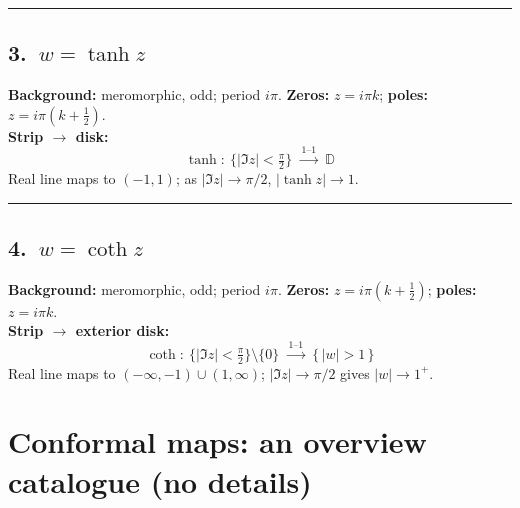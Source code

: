 \documentclass[11pt]{article}
\begin{document}
\bigskip\hrule\bigskip

\subsection*{3.\ $w=\tanh z$}
\textbf{Background:} meromorphic, odd; period $i\pi$. \quad
\textbf{Zeros:} $z=i\pi k$; \textbf{poles:} $z=i\pi(k+\tfrac12)$.\\
\textbf{Strip $\to$ disk:}
\[
\boxed{\,\tanh:\ \{|\Im z|<\tfrac{\pi}{2}\}\ \xrightarrow{\ 1\text{--}1\ }\ \mathbb D\,}
\]
Real line maps to $(-1,1)$; as $|\Im z|\to\pi/2$, $|\tanh z|\to1$.

\bigskip\hrule\bigskip

\subsection*{4.\ $w=\coth z$}
\textbf{Background:} meromorphic, odd; period $i\pi$. \quad
\textbf{Zeros:} $z=i\pi(k+\tfrac12)$; \textbf{poles:} $z=i\pi k$.\\
\textbf{Strip $\to$ exterior disk:}
\[
\boxed{\,\coth:\ \{|\Im z|<\tfrac{\pi}{2}\}\setminus\{0\}\ \xrightarrow{\ 1\text{--}1\ }\ \{\,|w|>1\,\}\,}
\]
Real line maps to $(-\infty,-1)\cup(1,\infty)$; $|\Im z|\to\pi/2$ gives $|w|\to1^+$.







	
\section*{Conformal maps: an overview catalogue (no details)}
\end{document}
